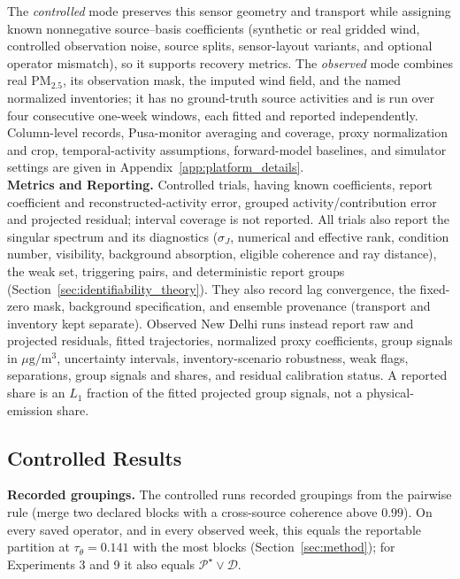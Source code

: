 The \emph{controlled} mode preserves this sensor geometry and transport while
assigning known nonnegative source--basis coefficients (synthetic or real gridded
wind, controlled observation noise, source splits, sensor-layout variants, and
optional operator mismatch), so it supports recovery metrics.  The \emph{observed} mode combines real PM\(_{2.5}\), its observation
mask, the imputed wind field, and the named normalized inventories; it has no
ground-truth source activities and is run over four consecutive one-week windows,
each fitted and reported independently.  Column-level records, Pusa-monitor
averaging and coverage, proxy normalization and crop, temporal-activity
assumptions, forward-model baselines, and simulator settings are given in
Appendix~\ref{app:platform_details}.\\


\noindent\textbf{Metrics and Reporting.}
Controlled trials, having known coefficients, report coefficient and
reconstructed-activity error, grouped activity/contribution error and projected
residual; interval coverage is not reported.  All trials also report the singular
spectrum and its diagnostics (\(\sigma_J\), numerical and effective rank, condition
number, visibility, background absorption, eligible coherence and ray distance), the
weak set, triggering pairs, and deterministic report groups
(Section~\ref{sec:identifiability_theory}).  They also record lag convergence, the
fixed-zero mask, background specification, and ensemble provenance (transport and
inventory kept separate).  Observed New Delhi runs instead report raw and
projected residuals, fitted trajectories, normalized proxy coefficients, group
signals in \(\mu\mathrm g/\mathrm m^3\), uncertainty intervals, inventory-scenario robustness,
weak flags, separations, group signals and shares, and residual calibration
status.  A reported share is an \(L_1\) fraction of the fitted projected group
signals, not a physical-emission share.

\subsection{Controlled Results}



\noindent\textbf{Recorded groupings.}  The controlled runs recorded groupings from the
pairwise rule (merge two declared blocks with a cross-source coherence above \(0.99\)).
On every saved operator, and in every observed week, this equals the reportable
partition at \(\tau_\theta=0.141\) with the most blocks (Section~\ref{sec:method}); for
Experiments 3 and 9 it also equals \(\mathcal P^\star\vee\mathcal D\).
\label{subsec:controlled_results}

